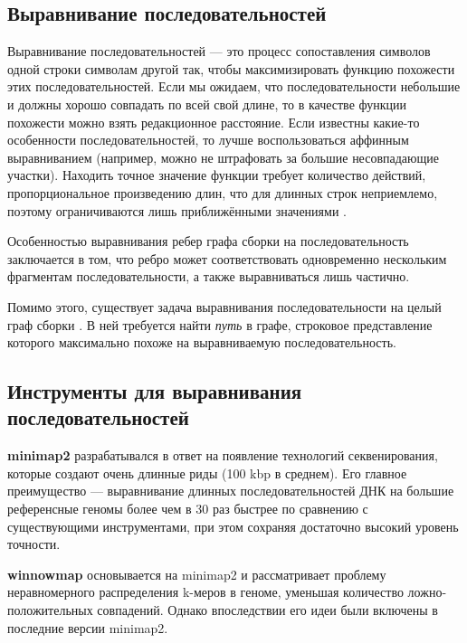 \documentclass[14pt]{matmex-diploma-custom}
\begin{document}
\subsection{Выравнивание последовательностей}
Выравнивание последовательностей --- это процесс сопоставления символов одной строки символам другой так, чтобы максимизировать функцию похожести этих последовательностей. Если мы ожидаем, что последовательности небольшие и должны хорошо совпадать по всей свой длине, то в качестве функции похожести можно взять редакционное расстояние. Если известны какие-то особенности последовательностей, то лучше воспользоваться аффинным выравниванием (например, можно не штрафовать за большие несовпадающие участки). Находить точное значение функции требует количество действий, пропорциональное произведению длин, что для длинных строк неприемлемо, поэтому ограничиваются лишь приближёнными значениями \cite{art:likic2008needleman}.

Особенностью выравнивания ребер графа сборки на последовательность заключается в том, что ребро может соответствовать одновременно нескольким фрагментам последовательности, а также выравниваться лишь частично.

Помимо этого, существует задача выравнивания последовательности на целый граф сборки \cite{art:spaligner, art:rautiainen2020graphaligner}. В ней требуется найти \textit{путь} в графе, строковое представление которого максимально похоже на выравниваемую последовательность. 

\subsection{Инструменты для выравнивания последовательностей }



\textbf{minimap2} \cite{art:minimap2} разрабатывался в ответ на появление технологий секвенирования, которые создают очень длинные риды (100 kbp в среднем). Его главное преимущество --- выравнивание длинных последовательностей ДНК на большие референсные геномы более чем в 30 раз быстрее \cite{art:minimap2} по сравнению с существующими инструментами, при этом сохраняя достаточно высокий уровень точности.

\textbf{winnowmap} \cite{art:winnowmap} основывается на minimap2 и рассматривает проблему неравномерного распределения k-меров в геноме, уменьшая количество ложно-положительных совпадений. Однако впоследствии его идеи были включены в последние версии minimap2.
\end{document}

